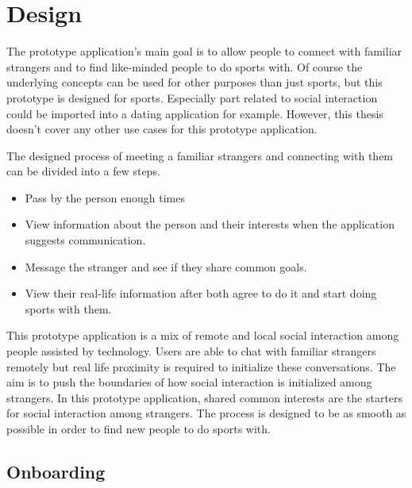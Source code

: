 \section{Design}

The prototype application's main goal is to allow people to connect with familiar strangers and to find like-minded people to do sports with. Of course the underlying concepts can be used for other purposes than just sports, but this prototype is designed for sports. Especially part related to social interaction could be imported into a dating application for example. However, this thesis doesn't cover any other use cases for this prototype application.

The designed process of meeting a familiar strangers and connecting with them can be divided into a few steps.

\begin{itemize}
	\item Pass by the person enough times
	\item View information about the person and their interests when the application suggests communication.
	\item Message the stranger and see if they share common goals.
	\item View their real-life information after both agree to do it and start doing sports with them.
\end{itemize}

This prototype application is a mix of remote and local social interaction among people assisted by technology. Users are able to chat with familiar strangers remotely but real life proximity is required to initialize these conversations. The aim is to push the boundaries of how social interaction is initialized among strangers. In this prototype application, shared common interests are the starters for social interaction among strangers. The process is designed to be as smooth as possible in order to find new people to do sports with.

\subsection{Onboarding}

